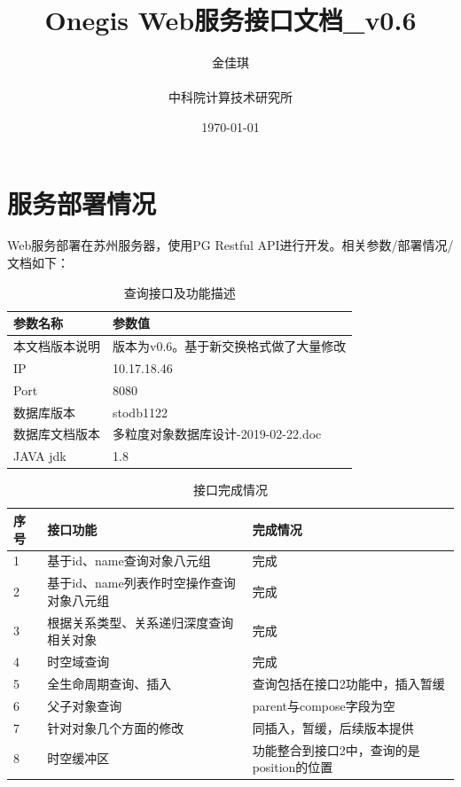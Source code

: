 \documentclass[UTF8, 12pt]{ctexart}
\author{金佳琪\\
\\
\large 中科院计算技术研究所}
\title{Onegis Web服务接口文档\_v0.6}
\date{\today}
\begin{document}
\maketitle\thispagestyle{fancy}
\tableofcontents\thispagestyle{fancy}

\section{服务部署情况}
	Web服务部署在苏州服务器，使用PG Restful API进行开发。相关参数/部署情况/文档如下：
	\begin{table}[H]
		\centering
		\caption{查询接口及功能描述}
		\begin{tabular}{|p{6cm}|p{8cm}|}
			\hline
			参数名称 & 参数值 \\
			\hline
			本文档版本说明 & 版本为v0.6。基于新交换格式做了大量修改 \\
			\hline
			IP & 10.17.18.46 \\
			\hline
			Port & 8080 \\
			\hline
			数据库版本 & stodb1122 \\
			\hline
			数据库文档版本 & 多粒度对象数据库设计-2019-02-22.doc \\
			\hline
			JAVA jdk & 1.8 \\
			\hline
		\end{tabular}
	\end{table}

	\begin{table}[H]
		\centering
		\caption{接口完成情况}
		\begin{tabular}{|p{1cm}|p{6cm}|p{8cm}|}
			\hline
			序号 & 接口功能 & 完成情况 \\
			\hline
			1 & 基于id、name查询对象八元组 & 完成 \\
			\hline
			2 & 基于id、name列表作时空操作查询对象八元组 & 完成 \\
			\hline
			3 & 根据关系类型、关系递归深度查询相关对象 & 完成 \\
			\hline
			4 & 时空域查询 & 完成 \\
			\hline
			5 & 全生命周期查询、插入 & 查询包括在接口2功能中，插入暂缓 \\
			\hline
			6 & 父子对象查询 & parent与compose字段为空 \\
			\hline
			7 & 针对对象几个方面的修改 & 同插入，暂缓，后续版本提供 \\
			\hline
			8 & 时空缓冲区 & 功能整合到接口2中，查询的是position的位置 \\
			\hline
		\end{tabular}
	\end{table}
	
\end{document}
